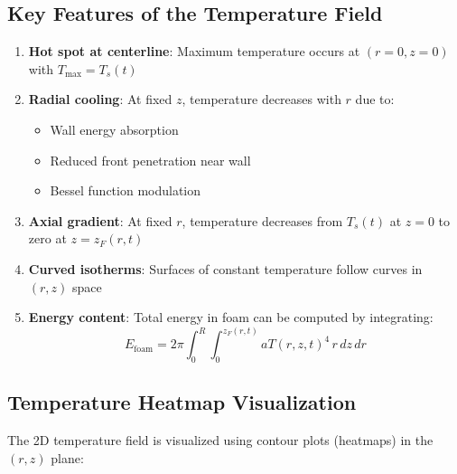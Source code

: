 \documentclass[12pt,a4paper]{article}
\begin{document}
\subsection{Key Features of the Temperature Field}

\begin{enumerate}
    \item \textbf{Hot spot at centerline}: Maximum temperature occurs at $(r=0, z=0)$ with $T_{\max} = T_s(t)$
    
    \item \textbf{Radial cooling}: At fixed $z$, temperature decreases with $r$ due to:
    \begin{itemize}
        \item Wall energy absorption
        \item Reduced front penetration near wall
        \item Bessel function modulation
    \end{itemize}
    
    \item \textbf{Axial gradient}: At fixed $r$, temperature decreases from $T_s(t)$ at $z=0$ to zero at $z=z_F(r,t)$
    
    \item \textbf{Curved isotherms}: Surfaces of constant temperature follow curves in $(r,z)$ space
    
    \item \textbf{Energy content}: Total energy in foam can be computed by integrating:
    \begin{equation}
    E_{\text{foam}} = 2\pi \int_0^R \int_0^{z_F(r,t)} a T(r,z,t)^4 \, r \, dz \, dr
    \end{equation}
\end{enumerate}

\subsection{Temperature Heatmap Visualization}

The 2D temperature field is visualized using contour plots (heatmaps) in the $(r,z)$ plane:
\end{document}
